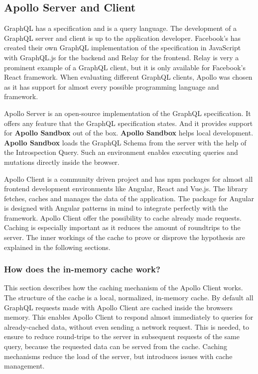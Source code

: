 \subsection{Apollo Server and Client}

GraphQL has a specification and is a query language. The development of a GraphQL server and client is up to the application developer. Facebook's has created their own GraphQL implementation of the specification in JavaScript with GraphQL.js for the backend and Relay for the frontend. Relay is very a prominent example of a GraphQL client, but it is only available for Facebook's React framework. When evaluating different GraphQL clients, Apollo was chosen as it has support for almost every possible programming language and framework.

\bigskip

\noindent Apollo Server is an open-source implementation of the GraphQL specification. It offers any feature that the GraphQL specification states. And it provides support for \textbf{Apollo Sandbox} out of the box. \cite{misc:-:background:graphql:apollo-server-introduction} \textbf{Apollo Sandbox} helps local development. \textbf{Apollo Sandbox} loads the GraphQL Schema from the server with the help of the Introspection Query. \cite{misc:-:background:graphql:apollo-sandbox} Such an environment enables executing queries and mutations directly inside the browser.

\bigskip

\noindent Apollo Client is a community driven project and has npm packages for almost all frontend development environments like Angular, React and Vue.js. The library fetches, caches and manages the data of the application. The package for Angular is designed with Angular patterns in mind to integrate perfectly with the framework. Apollo Client offer the possibility to cache already made requests. \cite{misc:-:background:graphql:apollo-angular-client-overview} \cite{misc:-:background:graphql:apollo-client-overview} Caching is especially important as it reduces the amount of roundtrips to the server. The inner workings of the cache to prove or disprove the hypothesis are explained in the following sections.

\subsubsection{How does the in-memory cache work?}

This section describes how the caching mechanism of the Apollo Client works. The structure of the cache is a local, normalized, in-memory cache. By default all GraphQL requests made with Apollo Client are cached inside the browsers memory. This enables Apollo Client to respond almost immediately to queries for already-cached data, without even sending a network request. This is needed, to ensure to reduce round-trips to the server in subsequent requests of the same query, because the requested data can be served from the cache. \cite{misc:-:background:graphql:apollo-client-cache-overview} Caching mechanisms reduce the load of the server, but introduces issues with cache management.

